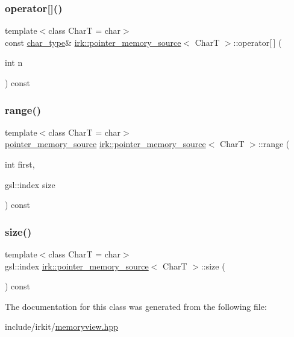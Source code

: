 \subsubsection{\texorpdfstring{operator[]()}{operator[]()}}
{\footnotesize\ttfamily template$<$class CharT  = char$>$ \\
const \mbox{\hyperlink{classirk_1_1pointer__memory__source_a4b778df8efee229fdafbd4de413dbf61}{char\+\_\+type}}\& \mbox{\hyperlink{classirk_1_1pointer__memory__source}{irk\+::pointer\+\_\+memory\+\_\+source}}$<$ CharT $>$\+::operator\mbox{[}$\,$\mbox{]} (\begin{DoxyParamCaption}\item[{int}]{n }\end{DoxyParamCaption}) const\hspace{0.3cm}{\ttfamily [inline]}}

\mbox{\label{classirk_1_1pointer__memory__source_a0319e9ddcf38ea514b26c20cd41a7ec5}} 
\subsubsection{\texorpdfstring{range()}{range()}}
{\footnotesize\ttfamily template$<$class CharT  = char$>$ \\
\mbox{\hyperlink{classirk_1_1pointer__memory__source}{pointer\+\_\+memory\+\_\+source}} \mbox{\hyperlink{classirk_1_1pointer__memory__source}{irk\+::pointer\+\_\+memory\+\_\+source}}$<$ CharT $>$\+::range (\begin{DoxyParamCaption}\item[{int}]{first,  }\item[{gsl\+::index}]{size }\end{DoxyParamCaption}) const\hspace{0.3cm}{\ttfamily [inline]}}

\mbox{\label{classirk_1_1pointer__memory__source_abacd920a55db430eba44122a4771b0bd}} 
\subsubsection{\texorpdfstring{size()}{size()}}
{\footnotesize\ttfamily template$<$class CharT  = char$>$ \\
gsl\+::index \mbox{\hyperlink{classirk_1_1pointer__memory__source}{irk\+::pointer\+\_\+memory\+\_\+source}}$<$ CharT $>$\+::size (\begin{DoxyParamCaption}{ }\end{DoxyParamCaption}) const\hspace{0.3cm}{\ttfamily [inline]}}



The documentation for this class was generated from the following file\+:\begin{DoxyCompactItemize}
\item 
include/irkit/\mbox{\hyperlink{memoryview_8hpp}{memoryview.\+hpp}}\end{DoxyCompactItemize}
